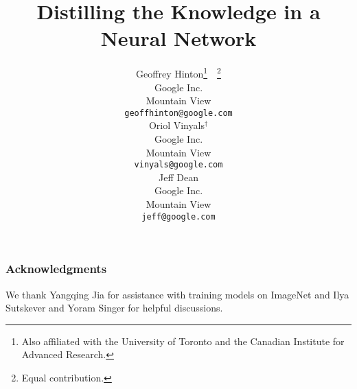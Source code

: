\documentclass{article} %
\title{Distilling the Knowledge in a Neural Network}
\author{
Geoffrey Hinton\thanks{Also affiliated with the University of Toronto
  and the Canadian Institute for Advanced Research.}\ \ \thanks{Equal contribution.} \\
Google Inc.\\
Mountain View\\
\texttt{geoffhinton@google.com} \\
\And
Oriol Vinyals$^\dagger$\\
Google Inc.\\
Mountain View\\
\texttt{vinyals@google.com} \\
\And
Jeff Dean\\
Google Inc.\\
Mountain View\\
\texttt{jeff@google.com} \\
}
\begin{document}
\maketitle






 













\subsubsection*{Acknowledgments}

We thank Yangqing Jia for assistance with training models on ImageNet and Ilya
Sutskever and Yoram Singer for helpful discussions. 



\end{document}
